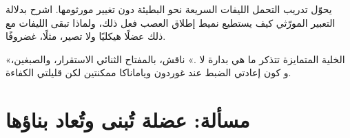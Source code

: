 \begin{exercise}[$\star\star\star$]\label{exo:b2:cell-differentiation:11}
يحوّل تدريب التحمل الليفات السريعة نحو البطيئة دون
تغيير مورثومها. اشرح بدلالة التعبير المورّثي كيف يستطيع
نميط إطلاق العصب فعل ذلك، ولماذا تبقى الليفات مع ذلك
عضلًا هيكليًا ولا تصير، مثلًا، غضروفًا.
\end{exercise}

\begin{exercise}[$\star\star\star$]\label{exo:b2:cell-differentiation:12}
«الخلية المتمايزة تتذكر ما هي بدارة لا
.» ناقش، بالمفتاح الثنائي الاستقرار، والصبغين، و
كون إعادتي الضبط عند غوردون وياماناكا ممكنتين لكن
قليلتي الكفاءة.
\end{exercise}

\section{مسألة: عضلة تُبنى وتُعاد بناؤها}

